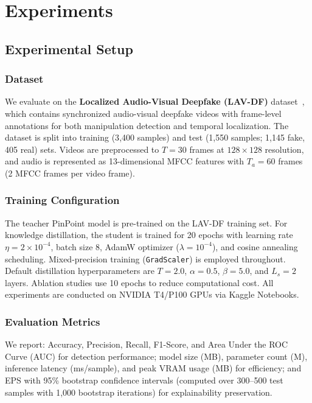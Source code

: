 \documentclass[lettersize,journal]{IEEEtran}
\begin{document}
\section{Experiments}
\label{sec:experiments}

\subsection{Experimental Setup}

\subsubsection{Dataset}
We evaluate on the \textbf{Localized Audio-Visual Deepfake (LAV-DF)} dataset~\cite{cai2022lavdf}, which contains synchronized audio-visual deepfake videos with frame-level annotations for both manipulation detection and temporal localization. The dataset is split into training (3{,}400 samples) and test (1{,}550 samples; 1{,}145 fake, 405 real) sets. Videos are preprocessed to $T = 30$ frames at $128 \times 128$ resolution, and audio is represented as 13-dimensional MFCC features with $T_a = 60$ frames (2 MFCC frames per video frame).

\subsubsection{Training Configuration}
The teacher PinPoint model is pre-trained on the LAV-DF training set. For knowledge distillation, the student is trained for 20 epochs with learning rate $\eta = 2 \times 10^{-4}$, batch size 8, AdamW optimizer ($\lambda = 10^{-4}$), and cosine annealing scheduling. Mixed-precision training (\texttt{GradScaler}) is employed throughout. Default distillation hyperparameters are $T = 2.0$, $\alpha = 0.5$, $\beta = 5.0$, and $L_s = 2$ layers. Ablation studies use 10 epochs to reduce computational cost. All experiments are conducted on NVIDIA T4/P100 GPUs via Kaggle Notebooks.

\subsubsection{Evaluation Metrics}
We report: Accuracy, Precision, Recall, F1-Score, and Area Under the ROC Curve (AUC) for detection performance; model size (MB), parameter count (M), inference latency (ms/sample), and peak VRAM usage (MB) for efficiency; and EPS with 95\% bootstrap confidence intervals (computed over 300--500 test samples with 1{,}000 bootstrap iterations) for explainability preservation.
\end{document}
